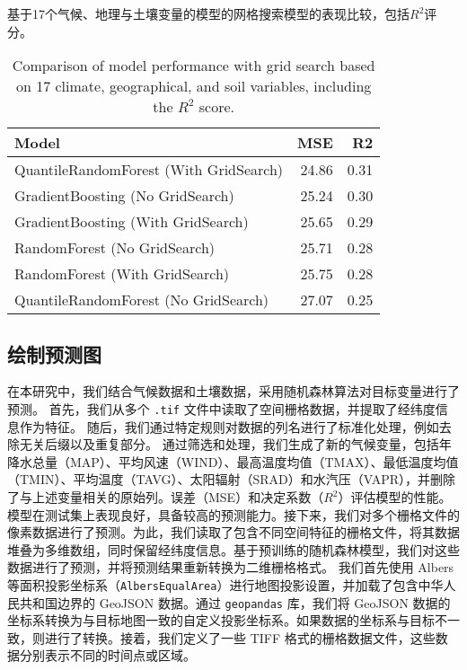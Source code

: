 \documentclass[AutoFakeBold]{LZUThesis-PgD&PhD}
\begin{document}
	
	\begin{table}[H]
		\centering
		\caption{基于17个气候、地理与土壤变量的模型的网格搜索模型的表现比较，包括$R^2$评分。}
		\caption*{Comparison of model performance with grid search based on 17 climate, geographical, and soil variables, including the $R^2$ score.}
		
		\begin{tabular}{lrr}
			\toprule
			Model & MSE & R2 \\
			\midrule
			QuantileRandomForest (With GridSearch) & 24.86 & 0.31 \\
			GradientBoosting (No GridSearch) & 25.24 & 0.30 \\
			GradientBoosting (With GridSearch) & 25.65 & 0.29 \\
			RandomForest (No GridSearch) & 25.71 & 0.28 \\
			RandomForest (With GridSearch) & 25.75 & 0.28 \\
			QuantileRandomForest (No GridSearch) & 27.07 & 0.25 \\
			\bottomrule
		\end{tabular}
	\end{table}
	
	\subsection{绘制预测图}
	\par
	在本研究中，我们结合气候数据和土壤数据，采用随机森林算法对目标变量进行了预测。
	首先，我们从多个 \texttt{.tif} 文件中读取了空间栅格数据，并提取了经纬度信息作为特征。
	随后，我们通过特定规则对数据的列名进行了标准化处理，例如去除无关后缀以及重复部分。
	通过筛选和处理，我们生成了新的气候变量，包括年降水总量（MAP）、平均风速（WIND）、最高温度均值（TMAX）、最低温度均值（TMIN）、平均温度（TAVG）、太阳辐射（SRAD）和水汽压（VAPR），并删除了与上述变量相关的原始列。误差（MSE）和决定系数（$R^2$）评估模型的性能。模型在测试集上表现良好，具备较高的预测能力。接下来，我们对多个栅格文件的像素数据进行了预测。为此，我们读取了包含不同空间特征的栅格文件，将其数据堆叠为多维数组，同时保留经纬度信息。基于预训练的随机森林模型，我们对这些数据进行了预测，并将预测结果重新转换为二维栅格格式。
	我们首先使用 Albers 等面积投影坐标系（\texttt{AlbersEqualArea}）进行地图投影设置，并加载了包含中华人民共和国边界的 GeoJSON 数据。通过 \texttt{geopandas} 库，我们将 GeoJSON 数据的坐标系转换为与目标地图一致的自定义投影坐标系。如果数据的坐标系与目标不一致，则进行了转换。接着，我们定义了一些 TIFF 格式的栅格数据文件，这些数据分别表示不同的时间点或区域。
	
\end{document}
